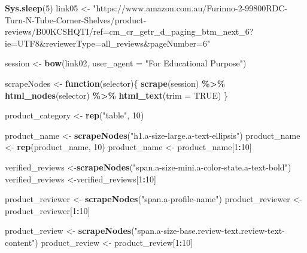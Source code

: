 \documentclass[
]{article}
\newenvironment{Shaded}{\begin{snugshade}}{\end{snugshade}}
\newcommand{\AttributeTok}[1]{\textcolor[rgb]{0.13,0.29,0.53}{#1}}
\newcommand{\ConstantTok}[1]{\textcolor[rgb]{0.56,0.35,0.01}{#1}}
\newcommand{\ControlFlowTok}[1]{\textcolor[rgb]{0.13,0.29,0.53}{\textbf{#1}}}
\newcommand{\DecValTok}[1]{\textcolor[rgb]{0.00,0.00,0.81}{#1}}
\newcommand{\FunctionTok}[1]{\textcolor[rgb]{0.13,0.29,0.53}{\textbf{#1}}}
\newcommand{\NormalTok}[1]{#1}
\newcommand{\OtherTok}[1]{\textcolor[rgb]{0.56,0.35,0.01}{#1}}
\newcommand{\SpecialCharTok}[1]{\textcolor[rgb]{0.81,0.36,0.00}{\textbf{#1}}}
\newcommand{\StringTok}[1]{\textcolor[rgb]{0.31,0.60,0.02}{#1}}
\begin{document}
\begin{Shaded}
\begin{Highlighting}[]
   \FunctionTok{Sys.sleep}\NormalTok{(}\DecValTok{5}\NormalTok{)}
\NormalTok{link05 }\OtherTok{\textless{}{-}} \StringTok{"https://www.amazon.com.au/Furinno{-}2{-}99800RDC{-}Turn{-}N{-}Tube{-}Corner{-}Shelves/product{-}reviews/B00KCSHQTI/ref=cm\_cr\_getr\_d\_paging\_btm\_next\_6?ie=UTF8\&reviewerType=all\_reviews\&pageNumber=6"}


\NormalTok{  session }\OtherTok{\textless{}{-}} \FunctionTok{bow}\NormalTok{(link02,}
               \AttributeTok{user\_agent =} \StringTok{"For Educational Purpose"}\NormalTok{)}

\NormalTok{  scrapeNodes }\OtherTok{\textless{}{-}} \ControlFlowTok{function}\NormalTok{(selector)\{}
    \FunctionTok{scrape}\NormalTok{(session) }\SpecialCharTok{\%\textgreater{}\%}
      \FunctionTok{html\_nodes}\NormalTok{(selector) }\SpecialCharTok{\%\textgreater{}\%}
      \FunctionTok{html\_text}\NormalTok{(}\AttributeTok{trim =} \ConstantTok{TRUE}\NormalTok{)}
\NormalTok{  \}}

\NormalTok{  product\_category }\OtherTok{\textless{}{-}} \FunctionTok{rep}\NormalTok{(}\StringTok{"table"}\NormalTok{, }\DecValTok{10}\NormalTok{)}

\NormalTok{  product\_name }\OtherTok{\textless{}{-}} \FunctionTok{scrapeNodes}\NormalTok{(}\StringTok{"h1.a{-}size{-}large.a{-}text{-}ellipsis"}\NormalTok{)}
\NormalTok{  product\_name }\OtherTok{\textless{}{-}} \FunctionTok{rep}\NormalTok{(product\_name, }\DecValTok{10}\NormalTok{)}
\NormalTok{  product\_name }\OtherTok{\textless{}{-}}\NormalTok{ product\_name[}\DecValTok{1}\SpecialCharTok{:}\DecValTok{10}\NormalTok{]}
  
\NormalTok{  verified\_reviews }\OtherTok{\textless{}{-}}\FunctionTok{scrapeNodes}\NormalTok{(}\StringTok{"span.a{-}size{-}mini.a{-}color{-}state.a{-}text{-}bold"}\NormalTok{)}
\NormalTok{  verified\_reviews }\OtherTok{\textless{}{-}}\NormalTok{verified\_reviews[}\DecValTok{1}\SpecialCharTok{:}\DecValTok{10}\NormalTok{]}
  
\NormalTok{  product\_reviewer }\OtherTok{\textless{}{-}} \FunctionTok{scrapeNodes}\NormalTok{(}\StringTok{"span.a{-}profile{-}name"}\NormalTok{)}
\NormalTok{  product\_reviewer }\OtherTok{\textless{}{-}}\NormalTok{ product\_reviewer[}\DecValTok{1}\SpecialCharTok{:}\DecValTok{10}\NormalTok{]}
  
\NormalTok{  product\_review }\OtherTok{\textless{}{-}} \FunctionTok{scrapeNodes}\NormalTok{(}\StringTok{"span.a{-}size{-}base.review{-}text.review{-}text{-}content"}\NormalTok{)}
\NormalTok{  product\_review }\OtherTok{\textless{}{-}}\NormalTok{ product\_review[}\DecValTok{1}\SpecialCharTok{:}\DecValTok{10}\NormalTok{]}
  

\end{Highlighting}
\end{Shaded}
\end{document}
